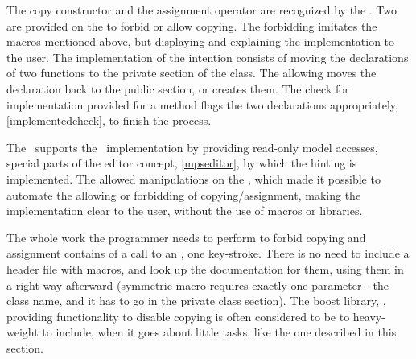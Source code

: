The copy constructor and the assignment operator are recognized by the \pcpp. Two  are provided on the 
  to forbid or allow copying. The forbidding  imitates the macros mentioned 
above, but displaying and explaining the implementation to the user. The implementation of the intention 
consists of moving the declarations of two functions to the private section of the class. The allowing  moves
the declaration back to the public section, or creates them. The check for implementation provided for a method flags
the two declarations appropriately, \ref{implementedcheck}, to finish the process.


The \jbmps\ supports the \pcpp\ implementation by providing read-only model accesses, special parts of the editor concept,
 \ref{mpseditor}, by which the hinting is implemented. The  allowed manipulations on the  , 
which made it possible to  automate the allowing or forbidding of copying/assignment, making the implementation clear 
to the user, without the use of macros or libraries. 

The whole work the programmer needs to perform to forbid copying and assignment contains of a call to an , 
one key-stroke. There is no need to include a header file with macros, and look up the documentation for them, using 
them in a right way afterward (symmetric macro requires exactly one parameter - the class name, and it has to go in 
the private class section). The boost library, \cite{boost}, providing functionality to disable copying is often considered to be to
heavy-weight to include, when it goes about little tasks, like the one described in this section.








